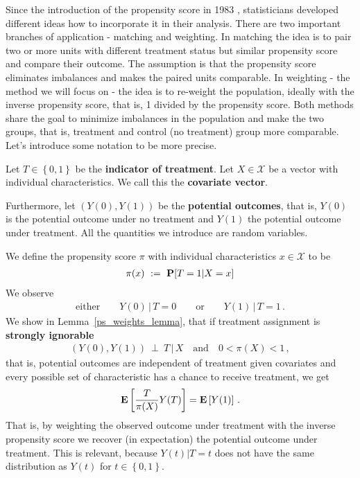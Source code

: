 Since the introduction of the propensity score in 1983 \cite{Rosenbaum1983}, statisticians developed different ideas how to incorporate it in their analysis. 
%
There are two important branches of application - matching and weighting.
In matching the idea is to pair two or more units with different treatment status but similar propensity score and compare their outcome. 
The assumption is that the propensity score eliminates imbalances and makes the paired units comparable.
In weighting - the method we will focus on - the idea is to re-weight the population, ideally with the inverse propensity score, that is, 1 divided by the propensity score.
Both methods share the goal to minimize imbalances in the population
and make the two groups, that is, treatment and control (no treatment) group more comparable.
Let's introduce some notation to be more precise.

Let $T\in \left\{ 0,1 \right\}$ be the \textbf{indicator of treatment}. 
Let $X\in\mathcal{X}$ be a vector with individual characteristics. We call this the \textbf{covariate vector}. 

Furthermore, let $(Y(0),Y(1))$ be the \textbf{potential outcomes}, that is, $Y(0)$ is the potential outcome under no treatment and $Y(1)$ the potential outcome under treatment.
All the quantities we introduce are random variables.

We define the propensity score $\pi$ with individual characteristics $x\in\mathcal{X}$ to be
\begin{gather*}
\pi(x)
\ 
:=
\ 
\P[T=1|X=x]
\end{gather*}
We observe  
\begin{gather*}
  \text{either}
  \qquad
  Y(0)\,|\,T=0
  \qquad
  \text{or}\qquad
  Y(1)\,|\,T=1
  \,.
\end{gather*}
We show in Lemma~\ref{ps_weights_lemma}, that if treatment assignment is \textbf{strongly ignorable}\cite[(1.3)]{Rosenbaum1983}
\begin{gather*}
  (Y(0),Y(1))\ \perp \ T \,|\,X
  \quad
  \text{and}
  \quad
  0<\pi(X)<1
  \,,
\end{gather*}
that is, 
potential outcomes are independent of treatment given covariates and every possible set of characteristic has a chance to receive treatment,
we get 
\begin{gather}
  \label{ipw}
  \mathbf{E}
  \left[ 
    \frac{T}{\pi(X)}Y(T)
  \right]
  =
  \mathbf{E}
  \left[ Y(1) \right]
  \,.
\end{gather}
That is, by weighting the observed outcome under treatment with the inverse propensity score we recover (in expectation) the potential outcome under treatment. 
This is relevant, because 
$Y(t)|T=t$ does not have the same distribution as $Y(t)$ for $t\in \left\{ 0,1 \right\}$.

